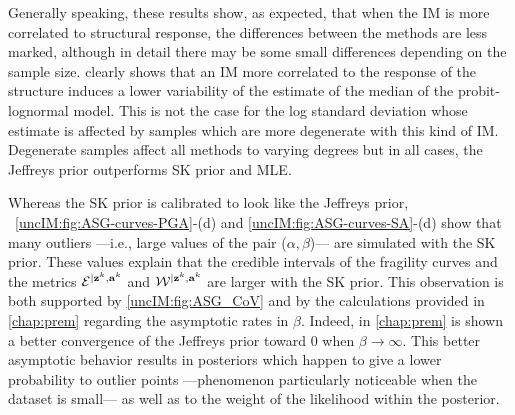    Generally speaking, these results show, as expected, that when the IM is more correlated to structural response, the differences between the methods are less marked, although in detail there may be some small differences depending on the sample size. { clearly shows that an IM more correlated to the response of the structure induces a lower variability of the estimate of the median of the probit-lognormal model. This is not the case for the log standard deviation whose estimate is affected by samples which are more degenerate with this kind of IM. %
   Degenerate samples affect
   all methods to varying degrees but in all cases, the Jeffreys prior outperforms SK prior and MLE.}
   
  Whereas the SK prior is calibrated to look like the Jeffreys prior, ~\ref{uncIM:fig:ASG-curves-PGA}-(d) and \ref{uncIM:fig:ASG-curves-SA}-(d) show that many outliers ---i.e., large values of the pair ($\alpha,\beta$)--- are simulated with the SK prior. These values explain that the credible intervals of the fragility curves and the metrics $\mathcal{E}^{|\mathbf{z}^{k},\mathbf{a}^{k}}$ and $\mathcal{W}^{|\mathbf{z}^{k},\mathbf{a}^{k}}$ are larger with the SK prior. This observation is both supported by \cref{uncIM:fig:ASG_CoV} and by the calculations provided in \cref{chap:prem} regarding the asymptotic rates in $\beta$. Indeed, in \cref{chap:prem} is shown a better convergence of the Jeffreys prior toward $0$ when $\beta\to\infty$. This better  asymptotic behavior results in posteriors which happen to give a lower probability to outlier points  ---phenomenon particularly noticeable when the dataset is small--- as well as to the weight of the likelihood within the posterior.
  
